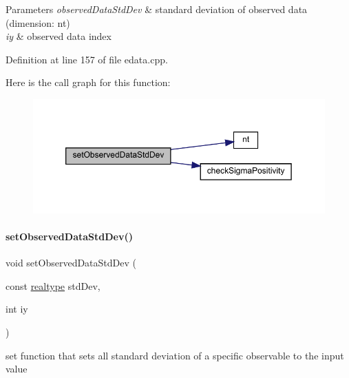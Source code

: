 \begin{DoxyParams}{Parameters}
{\em observed\+Data\+Std\+Dev} & standard deviation of observed data (dimension\+: nt) \\
\hline
{\em iy} & observed data index \\
\hline
\end{DoxyParams}


Definition at line 157 of file edata.\+cpp.

Here is the call graph for this function\+:
\nopagebreak
\begin{figure}[H]
\begin{center}
\leavevmode
\includegraphics[width=350pt]{classamici_1_1_exp_data_a90948c75e8ce51cd69be08a92215e6c2_cgraph}
\end{center}
\end{figure}
\mbox{\label{classamici_1_1_exp_data_a10c64e99f5f3a2b19e3944b69b0d69ff}} 
\paragraph{\texorpdfstring{set\+Observed\+Data\+Std\+Dev()}{setObservedDataStdDev()}\hspace{0.1cm}{\footnotesize\ttfamily [4/4]}}
{\footnotesize\ttfamily void set\+Observed\+Data\+Std\+Dev (\begin{DoxyParamCaption}\item[{const \mbox{\hyperlink{namespaceamici_a1bdce28051d6a53868f7ccbf5f2c14a3}{realtype}}}]{std\+Dev,  }\item[{int}]{iy }\end{DoxyParamCaption})}

set function that sets all standard deviation of a specific observable to the input value


